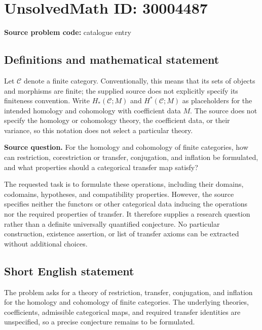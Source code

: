 \documentclass[11pt]{article}
\begin{document}
\section*{UnsolvedMath ID: 30004487}
\textbf{Source problem code:} catalogue entry
\subsection{Definitions and mathematical statement}
Let \(\mathcal C\) denote a finite category. Conventionally, this means that its sets of objects and morphisms are finite; the supplied source does not explicitly specify its finiteness convention. Write \(H_*(\mathcal C;M)\) and \(H^*(\mathcal C;M)\) as placeholders for the intended homology and cohomology with coefficient data \(M\). The source does not specify the homology or cohomology theory, the coefficient data, or their variance, so this notation does not select a particular theory.

\textbf{Source question.} For the homology and cohomology of finite categories, how can restriction, corestriction or transfer, conjugation, and inflation be formulated, and what properties should a categorical transfer map satisfy?

The requested task is to formulate these operations, including their domains, codomains, hypotheses, and compatibility properties. However, the source specifies neither the functors or other categorical data inducing the operations nor the required properties of transfer. It therefore supplies a research question rather than a definite universally quantified conjecture. No particular construction, existence assertion, or list of transfer axioms can be extracted without additional choices.
\subsection{Short English statement}
The problem asks for a theory of restriction, transfer, conjugation, and inflation for the homology and cohomology of finite categories. The underlying theories, coefficients, admissible categorical maps, and required transfer identities are unspecified, so a precise conjecture remains to be formulated.
\end{document}
